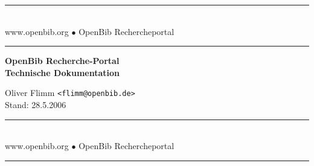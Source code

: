 \documentclass[11pt, twoside, a4paper, BCOR8mm, DIV12, bibtotoc,idxtotoc]{scrbook}
\begin{document}
\frontmatter

\begin{titlepage}

\begin{center}
\rule[-.1in]{16cm}{1mm}\\[3mm]
{\fontsize{20}{20pt}\selectfont
  www.openbib.org $\bullet$ OpenBib Rechercheportal}\\[-2mm]
\rule[-.1in]{16cm}{1mm}

\vspace{5cm}

  \textbf{\fontsize{30}{30pt}\selectfont OpenBib Recherche-Portal\\[3mm] Technische Dokumentation}

  \vspace{2cm}

  Oliver Flimm \texttt{<flimm@openbib.de>}\\
  Stand: 28.5.2006

  \vspace{8cm}

\rule[-.1in]{16cm}{1mm}\\[3mm]
{\fontsize{20}{20pt}\selectfont
  www.openbib.org $\bullet$ OpenBib Rechercheportal}\\[-2mm]
\rule[-.1in]{16cm}{1mm}

\end{center}

\end{titlepage}






\tableofcontents
\end{document}
